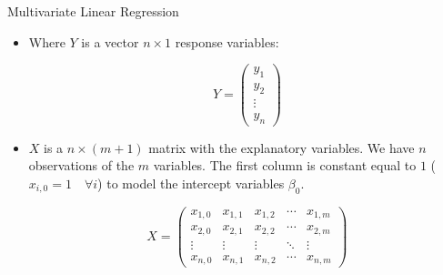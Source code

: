 \documentclass[handout]{beamer}
\begin{document}
\begin{frame}{Multivariate Linear Regression}
\scriptsize{
\begin{itemize} 
\item Where $Y$ is a vector $n\times 1$ response variables:

\begin{displaymath}
 Y =
 \begin{pmatrix}
  y_{1} \\
  y_{2}  \\
  \vdots  \\
  y_{n}
 \end{pmatrix}
\end{displaymath}

\item $X$ is a $n \times (m+1)$  matrix with the explanatory variables. We have $n$ observations of the $m$ variables.  The first column is constant equal to $1$ ($x_{i,0}=1 \quad \forall i$) to model the intercept variables $\beta_0$.

\begin{displaymath}
 X =
 \begin{pmatrix}
x_{1,0} &  x_{1,1} & x_{1,2} & \cdots & x_{1,m} \\
x_{2,0} &  x_{2,1} & x_{2,2} & \cdots & x_{2,m} \\
\vdots  &  \vdots  & \vdots  & \ddots & \vdots  \\
x_{n,0} &  x_{n,1} & x_{n,2} & \cdots & x_{n,m}
 \end{pmatrix}
\end{displaymath}






\end{itemize}
 

}
\end{frame}
\end{document}
